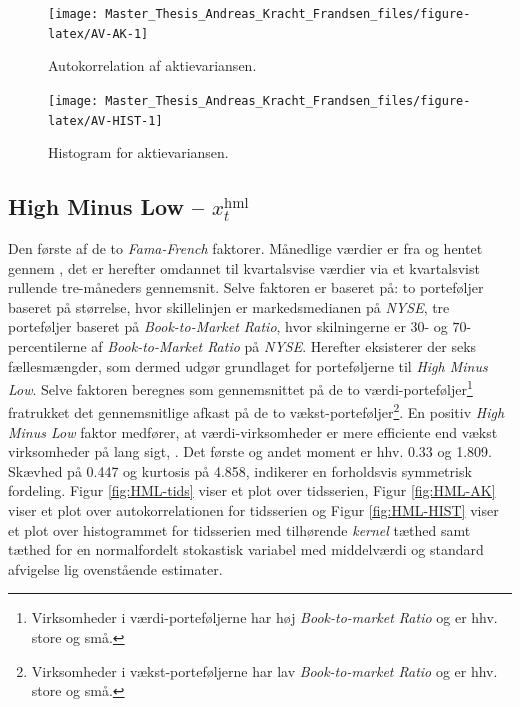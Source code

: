\documentclass[
  a4paper,
  oneside]{memoir}
\begin{document}
\begin{figure}[H]

{\centering \texttt{[image: Master\_Thesis\_Andreas\_Kracht\_Frandsen\_files/figure-latex/AV-AK-1]} 

}

\caption{Autokorrelation af aktievariansen.}\label{fig:AV-AK}
\end{figure}

\begin{figure}[H]

{\centering \texttt{[image: Master\_Thesis\_Andreas\_Kracht\_Frandsen\_files/figure-latex/AV-HIST-1]} 

}

\caption{Histogram for aktievariansen.}\label{fig:AV-HIST}
\end{figure}

\hypertarget{datahml}{%
\subsection{\texorpdfstring{High Minus Low -- \(x_t^{\text{hml}}\)}{High Minus Low -- x\_t\^{}\{\textbackslash text\{hml\}\}}}\label{datahml}}

Den første af de to \emph{Fama-French} faktorer. Månedlige værdier er fra \citep{CRSPakt} og hentet gennem \citep{French2020}, det er herefter omdannet til kvartalsvise værdier via et kvartalsvist rullende tre-måneders gennemsnit. Selve faktoren er baseret på: to porteføljer baseret på størrelse, hvor skillelinjen er markedsmedianen på \emph{NYSE}, tre porteføljer baseret på \emph{Book-to-Market Ratio}, hvor skilningerne er \(30\)- og \(70\)-percentilerne af \emph{Book-to-Market Ratio} på \emph{NYSE}. Herefter eksisterer der seks fællesmængder, som dermed udgør grundlaget for porteføljerne til \emph{High Minus Low}. Selve faktoren beregnes som gennemsnittet på de to værdi-porteføljer\footnote{Virksomheder i værdi-porteføljerne har høj \emph{Book-to-market Ratio} og er hhv. store og små.} fratrukket det gennemsnitlige afkast på de to vækst-porteføljer\footnote{Virksomheder i vækst-porteføljerne har lav \emph{Book-to-market Ratio} og er hhv. store og små.}. En positiv \emph{High Minus Low} faktor medfører, at værdi-virksomheder er mere efficiente end vækst virksomheder på lang sigt, \citep{French1993}. Det første og andet moment er hhv. 0.33 og 1.809. Skævhed på 0.447 og kurtosis på 4.858, indikerer en forholdsvis symmetrisk fordeling. Figur \ref{fig:HML-tids} viser et plot over tidsserien, Figur \ref{fig:HML-AK} viser et plot over autokorrelationen for tidsserien og Figur \ref{fig:HML-HIST} viser et plot over histogrammet for tidsserien med tilhørende \emph{kernel} tæthed samt tæthed for en normalfordelt stokastisk variabel med middelværdi og standard afvigelse lig ovenstående estimater.
\end{document}
